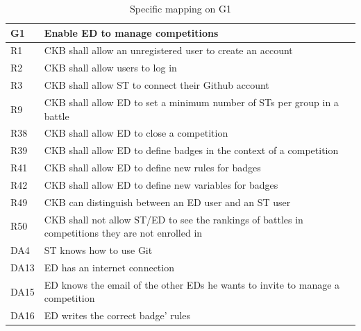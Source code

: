   \begin{table}[H]
    \begin{tabular}{|l|p{12cm}| }
      \hline
      \textbf{G1} & \textbf{Enable ED to manage competitions}      \\
      \hline
      R1 & CKB shall allow an unregistered user to create an account \\
      \hline
      R2 & CKB shall allow users to log in \\
      \hline
      R3 & CKB shall allow ST to connect their Github account \\
      \hline
      R9 & CKB shall allow ED to set a minimum number of STs per group in a battle \\
      \hline
      R38 & CKB shall allow ED to close a competition \\
      \hline
      R39 & CKB shall allow ED to define badges in the context of a competition \\
      \hline
      R41 & CKB shall allow ED to define new rules for badges \\
      \hline
      R42 & CKB shall allow ED to define new variables for badges \\
      \hline
      R49 & CKB can distinguish between an ED user and an ST user \\
      \hline
      R50 & CKB shall not allow ST/ED to see the rankings of battles in competitions they are not enrolled in \\
      \hline
      DA4 & ST knows how to use Git \\
      \hline
      DA13 & ED has an internet connection \\
      \hline
      DA15 & ED knows the email of the other EDs he wants to invite to manage a competition \\
      \hline
      DA16 & ED writes the correct badge’ rules \\
      \hline
    \end{tabular}
    \caption{Specific mapping on G1}
    \label{tab:mappingG1}
  \end{table}

